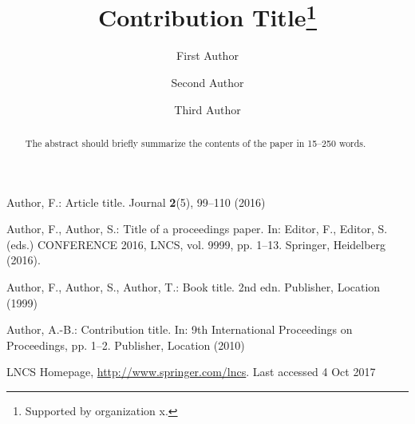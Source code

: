 \documentclass[runningheads]{llncs}
\begin{document}
	\title{Contribution Title\thanks{Supported by organization x.}}
	\author{First Author \and
		Second Author \and
		Third Author}
	\maketitle              %
	\begin{abstract}
		The abstract should briefly summarize the contents of the paper in
		15--250 words.
		
	\end{abstract}
	
	
	
	
	
	\begin{thebibliography}{8}
		Author, F.: Article title. Journal \textbf{2}(5), 99--110 (2016)
		
		Author, F., Author, S.: Title of a proceedings paper. In: Editor,
		F., Editor, S. (eds.) CONFERENCE 2016, LNCS, vol. 9999, pp. 1--13.
		Springer, Heidelberg (2016). 
		
		Author, F., Author, S., Author, T.: Book title. 2nd edn. Publisher,
		Location (1999)
		
		Author, A.-B.: Contribution title. In: 9th International Proceedings
		on Proceedings, pp. 1--2. Publisher, Location (2010)
		
		LNCS Homepage, \url{http://www.springer.com/lncs}. Last accessed 4
		Oct 2017
	\end{thebibliography}
\end{document}
